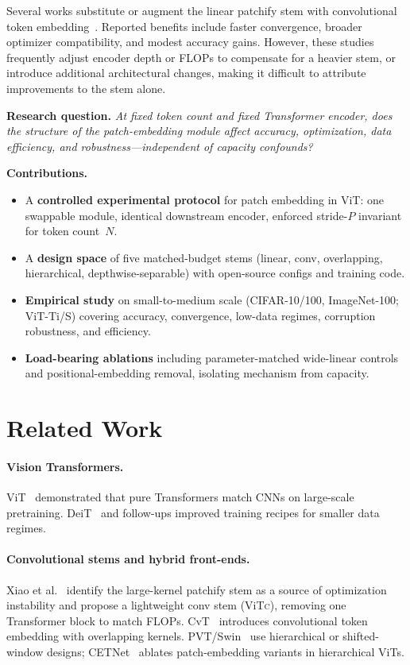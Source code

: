 \documentclass[10pt,twocolumn]{article}
\begin{document}
Several works substitute or augment the linear patchify stem with convolutional token embedding~\cite{xiao2021early,wu2021cvt,liu2021swin}.
Reported benefits include faster convergence, broader optimizer compatibility, and modest accuracy gains.
However, these studies frequently adjust encoder depth or FLOPs to compensate for a heavier stem, or introduce additional architectural changes, making it difficult to attribute improvements to the stem alone.

\textbf{Research question.} \emph{At fixed token count and fixed Transformer encoder, does the \emph{structure} of the patch-embedding module affect accuracy, optimization, data efficiency, and robustness---independent of capacity confounds?}

\textbf{Contributions.}
\begin{itemize}
  \item A \textbf{controlled experimental protocol} for patch embedding in ViT: one swappable module, identical downstream encoder, enforced stride-$P$ invariant for token count~$N$.
  \item A \textbf{design space} of five matched-budget stems (linear, conv, overlapping, hierarchical, depthwise-separable) with open-source configs and training code.
  \item \textbf{Empirical study} on small-to-medium scale (CIFAR-10/100, ImageNet-100; ViT-Ti/S) covering accuracy, convergence, low-data regimes, corruption robustness, and efficiency.
  \item \textbf{Load-bearing ablations} including parameter-matched wide-linear controls and positional-embedding removal, isolating mechanism from capacity.
\end{itemize}

\section{Related Work}
\label{sec:related}

\paragraph{Vision Transformers.}
ViT~\cite{dosovitskiy2021vit} demonstrated that pure Transformers match CNNs on large-scale pretraining.
DeiT~\cite{touvron2021deit} and follow-ups improved training recipes for smaller data regimes.

\paragraph{Convolutional stems and hybrid front-ends.}
Xiao et al.~\cite{xiao2021early} identify the large-kernel patchify stem as a source of optimization instability and propose a lightweight conv stem (ViT\textsc{c}), removing one Transformer block to match FLOPs.
CvT~\cite{wu2021cvt} introduces convolutional token embedding with overlapping kernels.
PVT/Swin~\cite{wang2021pvt,liu2021swin} use hierarchical or shifted-window designs; CETNet~\cite{cetnet2022} ablates patch-embedding variants in hierarchical ViTs.
\end{document}
